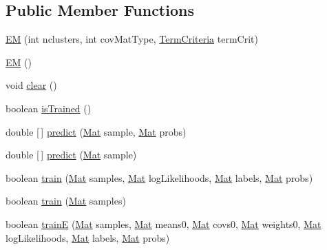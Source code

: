 \subsection*{Public Member Functions}
\begin{DoxyCompactItemize}
\item 
\mbox{\hyperlink{classorg_1_1opencv_1_1ml_1_1_e_m_acd119ab4c952342f4a5b48ba851e3280}{EM}} (int nclusters, int cov\+Mat\+Type, \mbox{\hyperlink{classorg_1_1opencv_1_1core_1_1_term_criteria}{Term\+Criteria}} term\+Crit)
\item 
\mbox{\hyperlink{classorg_1_1opencv_1_1ml_1_1_e_m_a1d19c6f1f90bed93ccedcb9e542a3a05}{EM}} ()
\item 
void \mbox{\hyperlink{classorg_1_1opencv_1_1ml_1_1_e_m_a80353ccd1a12c8d774c2d597fd3c450e}{clear}} ()
\item 
boolean \mbox{\hyperlink{classorg_1_1opencv_1_1ml_1_1_e_m_a957891c7b70c2b2a73b7ef227880223d}{is\+Trained}} ()
\item 
double \mbox{[}$\,$\mbox{]} \mbox{\hyperlink{classorg_1_1opencv_1_1ml_1_1_e_m_a5de2bf40f2adf7add3a4dea80c43b9d7}{predict}} (\mbox{\hyperlink{classorg_1_1opencv_1_1core_1_1_mat}{Mat}} sample, \mbox{\hyperlink{classorg_1_1opencv_1_1core_1_1_mat}{Mat}} probs)
\item 
double \mbox{[}$\,$\mbox{]} \mbox{\hyperlink{classorg_1_1opencv_1_1ml_1_1_e_m_a948b3059f105aee81e1380d14700abf6}{predict}} (\mbox{\hyperlink{classorg_1_1opencv_1_1core_1_1_mat}{Mat}} sample)
\item 
boolean \mbox{\hyperlink{classorg_1_1opencv_1_1ml_1_1_e_m_ac03590c48e384f486b3a205a0a9692d6}{train}} (\mbox{\hyperlink{classorg_1_1opencv_1_1core_1_1_mat}{Mat}} samples, \mbox{\hyperlink{classorg_1_1opencv_1_1core_1_1_mat}{Mat}} log\+Likelihoods, \mbox{\hyperlink{classorg_1_1opencv_1_1core_1_1_mat}{Mat}} labels, \mbox{\hyperlink{classorg_1_1opencv_1_1core_1_1_mat}{Mat}} probs)
\item 
boolean \mbox{\hyperlink{classorg_1_1opencv_1_1ml_1_1_e_m_a743b0d0266b20ac83e9efb4ce29499f6}{train}} (\mbox{\hyperlink{classorg_1_1opencv_1_1core_1_1_mat}{Mat}} samples)
\item 
boolean \mbox{\hyperlink{classorg_1_1opencv_1_1ml_1_1_e_m_a4fce629628dd0081269518d604fe2bfd}{trainE}} (\mbox{\hyperlink{classorg_1_1opencv_1_1core_1_1_mat}{Mat}} samples, \mbox{\hyperlink{classorg_1_1opencv_1_1core_1_1_mat}{Mat}} means0, \mbox{\hyperlink{classorg_1_1opencv_1_1core_1_1_mat}{Mat}} covs0, \mbox{\hyperlink{classorg_1_1opencv_1_1core_1_1_mat}{Mat}} weights0, \mbox{\hyperlink{classorg_1_1opencv_1_1core_1_1_mat}{Mat}} log\+Likelihoods, \mbox{\hyperlink{classorg_1_1opencv_1_1core_1_1_mat}{Mat}} labels, \mbox{\hyperlink{classorg_1_1opencv_1_1core_1_1_mat}{Mat}} probs)

\end{DoxyCompactItemize}
